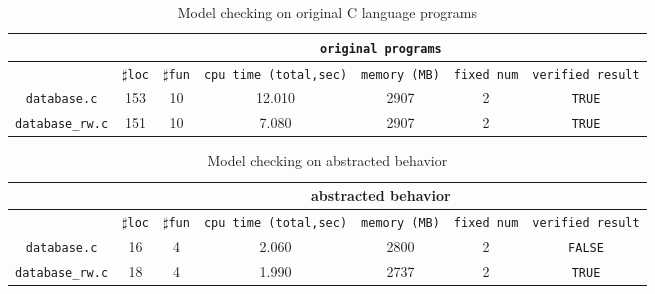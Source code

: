 \begin{table}
  \scriptsize
\begin{tabular}{|c|c|c|c|c|c|c|}
\hline
& \multicolumn{6}{|c|}{\texttt{original programs}}  \\
\hline
 & $\sharp$\texttt{loc} & $\sharp$\texttt{fun} & \texttt{cpu time (total,sec)} & \texttt{memory (MB)} & \texttt{fixed num}& \texttt{verified result} \\
\hline
\texttt{database.c} & 153 & 10 & 12.010 & 2907 & 2  & \texttt{TRUE}  \\
\hline
\texttt{database\_rw.c} & 151 & 10 & 7.080 & 2907 & 2  & \texttt{TRUE}  \\
\hline
\end{tabular}
\caption{Model checking on original C language programs}
\label{tb:mcc}
\end{table}

\begin{table}
  \scriptsize
\begin{tabular}{|c|c|c|c|c|c|c|}
\hline
&\multicolumn{6}{|c|}{abstracted behavior} \\
\hline
 &$\sharp$\texttt{loc} & $\sharp$\texttt{fun} & \texttt{cpu time (total,sec)} & \texttt{memory (MB)} & \texttt{fixed num} & \texttt{verified result} \\
\hline
\texttt{database.c} &  16 & 4 & 2.060 & 2800 & 2 & \texttt{FALSE} \\
\hline
\texttt{database\_rw.c} &  18 & 4 & 1.990 & 2737 & 2 & \texttt{TRUE} \\
\hline
\end{tabular}
\caption{Model checking on abstracted behavior}
\label{tb:mca}
\end{table}

